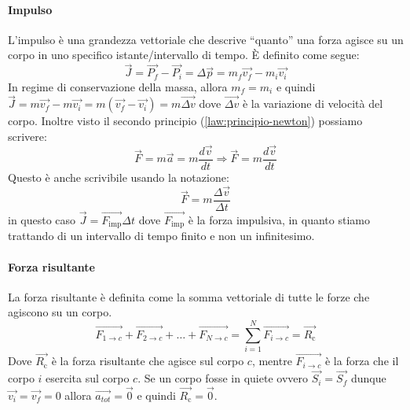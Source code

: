     \paragraph{Impulso}
        L'impulso è una grandezza vettoriale che descrive ``quanto'' una forza agisce su un corpo in uno specifico istante/intervallo di tempo. È definito come segue:
        $$
            \vec{J} = \vec{P_f} - \vec{P_i} = \Delta \vec{p} = m_f\vec{v_f} - m_i\vec{v_i}
        $$
        In regime di conservazione della massa, allora $m_f=m_i$ e quindi $\vec{J} = m\vec{v_f} - m\vec{v_i} = m(\vec{v_f} - \vec{v_i}) = m\vec{\Delta v}$ dove $\vec{\Delta v}$ è la variazione di velocità del corpo.\newline
        Inoltre visto il secondo principio (\ref{law:principio-newton}) possiamo scrivere:
        $$
            \vec{F} = m\vec{a} = m\frac{d\vec{v}}{dt} \Rightarrow \vec{F} = m\frac{d\vec{v}}{dt}
        $$
        Questo è anche scrivibile usando la notazione:
        $$
            \vec{F}=m\frac{\Delta \vec{v}}{\Delta t}
        $$
        in questo caso $\vec{J} = \vec{F_{\text{imp}}} \Delta t$ dove $\vec{F_{\text{imp}}}$ è la forza impulsiva, in quanto stiamo trattando di un intervallo di tempo finito e non un infinitesimo.
    \paragraph{Forza risultante}
        La forza risultante è definita come la somma vettoriale di tutte le forze che agiscono su un corpo. $$
            \vec{F_{1\rightarrow c}} + \vec{F_{2\rightarrow c}} + \dots + \vec{F_{N\rightarrow c}} = \sum_{i=1}^{N} \vec{F_{i\rightarrow c}} = \vec{R_{\text{c}}}
        $$
        Dove $\vec{R_{\text{c}}}$ è la forza risultante che agisce sul corpo $c$, mentre $\vec{F_{i\rightarrow c}}$ è la forza che il corpo $i$ esercita sul corpo $c$.\newline
        Se un corpo fosse in quiete ovvero $\vec{S_i} = \vec{S_f}$ dunque $\vec{v_i} = \vec{v_f} = 0$ allora $\vec{a_{tot}} = \vec{0}$ e quindi $\vec{R_{\text{c}}} = \vec{0}$.